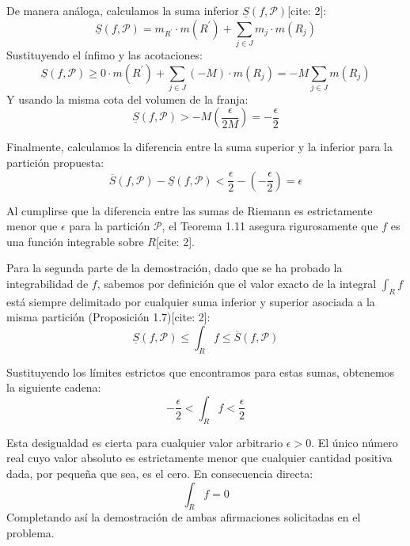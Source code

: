 \documentclass[11pt,letterpaper]{article}
\begin{document}
De manera análoga, calculamos la suma inferior $\underline{S}(f,\mathcal{P})$[cite: 2]:
\begin{equation*}
\underline{S}(f,\mathcal{P}) = m_{R^{\prime}} \cdot m(R^{\prime}) + \sum_{j \in J} m_{j} \cdot m(R_{j})
\end{equation*}
Sustituyendo el ínfimo y las acotaciones:
\begin{equation*}
\underline{S}(f,\mathcal{P}) \ge 0 \cdot m(R^{\prime}) + \sum_{j \in J} (-M) \cdot m(R_{j}) = -M \sum_{j \in J} m(R_{j})
\end{equation*}
Y usando la misma cota del volumen de la franja:
\begin{equation*}
\underline{S}(f,\mathcal{P}) > -M \left( \frac{\epsilon}{2M} \right) = -\frac{\epsilon}{2}
\end{equation*}

Finalmente, calculamos la diferencia entre la suma superior y la inferior para la partición propuesta:
\begin{equation*}
\overline{S}(f,\mathcal{P}) - \underline{S}(f,\mathcal{P}) < \frac{\epsilon}{2} - \left( -\frac{\epsilon}{2} \right) = \epsilon
\end{equation*}

Al cumplirse que la diferencia entre las sumas de Riemann es estrictamente menor que $\epsilon$ para la partición $\mathcal{P}$, el Teorema 1.11 asegura rigurosamente que $f$ es una función integrable sobre $R$[cite: 2].

Para la segunda parte de la demostración, dado que se ha probado la integrabilidad de $f$, sabemos por definición que el valor exacto de la integral $\int_{R}f$ está siempre delimitado por cualquier suma inferior y superior asociada a la misma partición (Proposición 1.7)[cite: 2]:
\begin{equation*}
\underline{S}(f,\mathcal{P}) \le \int_{R}f \le \overline{S}(f,\mathcal{P})
\end{equation*}

Sustituyendo los límites estrictos que encontramos para estas sumas, obtenemos la siguiente cadena:
\begin{equation*}
-\frac{\epsilon}{2} < \int_{R}f < \frac{\epsilon}{2}
\end{equation*}

Esta desigualdad es cierta para cualquier valor arbitrario $\epsilon > 0$. El único número real cuyo valor absoluto es estrictamente menor que cualquier cantidad positiva dada, por pequeña que sea, es el cero. En consecuencia directa:
\begin{equation*}
\int_{R}f = 0
\end{equation*}
Completando así la demostración de ambas afirmaciones solicitadas en el problema.
\end{document}
